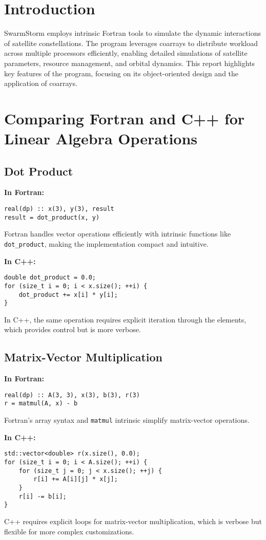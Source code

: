% 

\section{Introduction}
SwarmStorm employs intrinsic Fortran tools to simulate the dynamic interactions of satellite constellations. The program leverages coarrays to distribute workload across multiple processors efficiently, enabling detailed simulations of satellite parameters, resource management, and orbital dynamics. This report highlights key features of the program, focusing on its object-oriented design and the application of coarrays.

\section{Comparing Fortran and C++ for Linear Algebra Operations}

\subsection{Dot Product}

\textbf{In Fortran:}
\begin{lstlisting}[style=fortran]
real(dp) :: x(3), y(3), result
result = dot_product(x, y)
\end{lstlisting}
Fortran handles vector operations efficiently with intrinsic functions like \texttt{dot\_product}, making the implementation compact and intuitive.

\textbf{In C++:}
\begin{lstlisting}[style=cpp]
double dot_product = 0.0;
for (size_t i = 0; i < x.size(); ++i) {
    dot_product += x[i] * y[i];
}
\end{lstlisting}
In C++, the same operation requires explicit iteration through the elements, which provides control but is more verbose.

\subsection{Matrix-Vector Multiplication}

\textbf{In Fortran:}
\begin{lstlisting}[style=fortran]
real(dp) :: A(3, 3), x(3), b(3), r(3)
r = matmul(A, x) - b
\end{lstlisting}
Fortran's array syntax and \texttt{matmul} intrinsic simplify matrix-vector operations.

\textbf{In C++:}
\begin{lstlisting}[style=cpp]
std::vector<double> r(x.size(), 0.0);
for (size_t i = 0; i < A.size(); ++i) {
    for (size_t j = 0; j < x.size(); ++j) {
        r[i] += A[i][j] * x[j];
    }
    r[i] -= b[i];
}
\end{lstlisting}
C++ requires explicit loops for matrix-vector multiplication, which is verbose but flexible for more complex customizations.

\endinput  %
